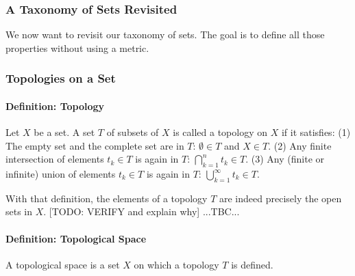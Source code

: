 \subsubsection{A Taxonomy of Sets Revisited}
We now want to revisit our taxonomy of sets. The goal is to define all those properties without using a metric.







\subsubsection{Topologies on a Set}


\paragraph{Definition: Topology} 
Let $X$ be a set. A set $T$ of subsets of $X$ is called a topology on $X$ if it satisfies: (1) The empty set and the complete set are in $T$: $\emptyset \in T$ and $X \in T$. (2) Any finite intersection of elements $t_k \in T$ is again in $T$: $\bigcap_{k=1}^n t_k \in T$. (3) Any (finite or infinite) union of elements $t_k \in T$ is again in $T$: $\bigcup_{k=1}^\infty t_k \in T$. 

\medskip
With that definition, the elements of a topology $T$ are indeed precisely the open sets in $X$. [TODO: VERIFY and explain why] ...TBC...



\paragraph{Definition: Topological Space} A topological space is a set $X$ on which a topology $T$ is defined.

